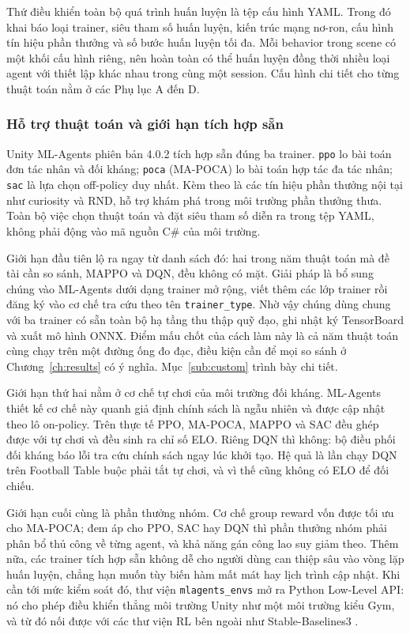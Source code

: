 \indent Thứ điều khiển toàn bộ quá trình huấn luyện là tệp cấu hình YAML. Trong đó khai
báo loại trainer, siêu tham số huấn luyện, kiến trúc mạng nơ-ron, cấu hình
tín hiệu phần thưởng và số bước huấn luyện tối đa. Mỗi behavior trong scene có một khối cấu hình riêng, nên hoàn toàn
có thể huấn luyện đồng thời nhiều loại agent với thiết lập khác nhau trong cùng một
session. Cấu hình chi tiết cho từng thuật toán nằm ở các Phụ lục A đến D.

\subsubsection{Hỗ trợ thuật toán và giới hạn tích hợp sẵn}
\label{sub:mllimits}
\indent Unity ML-Agents phiên bản 4.0.2 tích hợp sẵn đúng ba trainer. \texttt{ppo} lo bài
toán đơn tác nhân và đối kháng; \texttt{poca} (MA-POCA) lo bài toán hợp tác đa tác nhân;
\texttt{sac} là lựa chọn off-policy duy nhất. Kèm theo là các tín hiệu phần thưởng nội tại
như curiosity và RND, hỗ trợ khám phá trong môi trường phần thưởng thưa. Toàn bộ việc chọn
thuật toán và đặt siêu tham số diễn ra trong tệp YAML, không phải động vào mã nguồn C\#
của môi trường.

\indent Giới hạn đầu tiên lộ ra ngay từ danh sách đó: hai trong năm thuật toán mà đề tài
cần so sánh, MAPPO và DQN, đều không có mặt. Giải pháp là bổ sung chúng vào ML-Agents dưới
dạng trainer mở rộng, viết thêm các lớp trainer rồi đăng ký vào cơ chế tra cứu theo tên
\texttt{trainer\_type}. Nhờ vậy chúng dùng chung với ba trainer có sẵn toàn bộ hạ tầng thu
thập quỹ đạo, ghi nhật ký TensorBoard và xuất mô hình ONNX. Điểm mấu chốt của cách làm này
là cả năm thuật toán cùng chạy trên một đường ống đo đạc, điều kiện cần để mọi so sánh ở
Chương~\ref{ch:results} có ý nghĩa. Mục~\ref{sub:custom} trình bày chi tiết.

\indent Giới hạn thứ hai nằm ở cơ chế tự chơi của môi trường đối kháng. ML-Agents thiết kế
cơ chế này quanh giả định chính sách là ngẫu nhiên và được cập nhật theo lô on-policy.
Trên thực tế PPO, MA-POCA, MAPPO và SAC đều ghép được với tự chơi và đều sinh ra chỉ số
ELO. Riêng DQN thì không: bộ điều phối đối kháng báo lỗi tra cứu chính sách ngay lúc khởi
tạo. Hệ quả là lần chạy DQN trên Football Table buộc phải tắt tự chơi, và vì thế cũng
không có ELO để đối chiếu.

\indent Giới hạn cuối cùng là phần thưởng nhóm. Cơ chế group reward vốn được tối ưu
cho MA-POCA; đem áp cho PPO, SAC hay DQN thì phần thưởng nhóm phải phân bổ thủ công về từng
agent, và khả năng gán công lao suy giảm theo. Thêm nữa, các trainer tích hợp sẵn không dễ
cho người dùng can thiệp sâu vào vòng lặp huấn luyện, chẳng hạn muốn tùy biến hàm mất mát
hay lịch trình cập nhật. Khi cần tới mức kiểm soát đó, thư viện \texttt{mlagents\_envs}
mở ra Python Low-Level API: nó cho phép điều khiển thẳng môi trường Unity như một môi
trường kiểu Gym, và từ đó nối được với các thư viện RL bên ngoài như Stable-Baselines3
\cite{raffin2021stable}.
